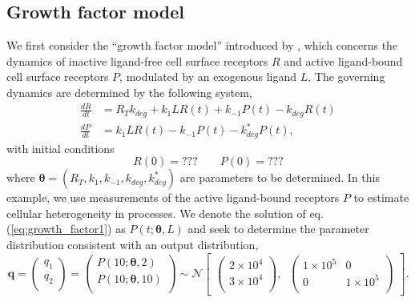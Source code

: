 \subsection{Growth factor model}
We first consider the ``growth factor model'' introduced by \cite{dixit2018maximum}, which concerns the dynamics of inactive ligand-free cell surface receptors $R$ and active ligand-bound cell surface receptors $P$, modulated by an exogenous ligand $L$. The governing dynamics are determined by the following system,
%
\begin{align}\label{eq:growth_factor}
\frac{dR}{dt} &= R_T k_{deg} + k_1 L R(t) + k_{-1} P(t) - k_{deg} R(t)\\
\label{eq:growth_factor1}
\frac{dP}{dt} &= k_1 L R(t) - k_{-1} P(t) - k^*_{deg} P(t),
\end{align}
with initial conditions
\begin{equation*}
R(0) = ??? \qquad P(0) = ???
\end{equation*}
%
where $\boldsymbol{\theta}=(R_T, k_1, k_{-1}, k_{deg}, k^*_{deg})$ are parameters to be determined. In this example, we use measurements of the active ligand-bound receptors $P$ to estimate cellular heterogeneity in processes. We denote the solution of eq. (\ref{eq:growth_factor1}) as $P(t; \boldsymbol{\theta}, L)$ and seek to determine the parameter distribution consistent with an output distribution,
%
\begin{equation}\label{eq:MM_outputDistribution}
\boldsymbol{q} =
\begin{pmatrix}
q_1\\
q_2\\
\end{pmatrix}
=
\begin{pmatrix}
P(10; \boldsymbol{\theta}, 2)\\
P(10; \boldsymbol{\theta}, 10)\\
\end{pmatrix} \sim  \mathcal{N}
\begin{bmatrix}
\begin{pmatrix}
2\times 10^4\\
3\times 10^4\\
\end{pmatrix}, \;\;
\begin{pmatrix}
1\times 10^5 & 0\\
0 & 1\times 10^5\\
\end{pmatrix}
\end{bmatrix}.
\end{equation}
%

